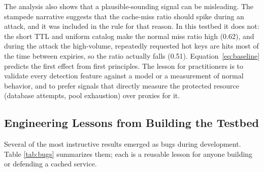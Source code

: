 The analysis also shows that a plausible-sounding signal can be misleading. The
stampede narrative suggests that the cache-miss ratio should spike during an attack,
and it was included in the rule for that reason. In this testbed it does not: the short
TTL and uniform catalog make the normal miss ratio high (0.62), and during the attack
the high-volume, repeatedly requested hot keys are hits most of the time between
expiries, so the ratio actually falls (0.51). Equation~\eqref{eq:baseline} predicts the
first effect from first principles. The lesson for practitioners is to validate every
detection feature against a model or a measurement of normal behavior, and to prefer
signals that directly measure the protected resource (database attempts, pool
exhaustion) over proxies for it.

\subsection{Engineering Lessons from Building the Testbed}
\label{sec:lessons}
Several of the most instructive results emerged as bugs during development. Table
\ref{tab:bugs} summarizes them; each is a reusable lesson for anyone building or
defending a cached service.

